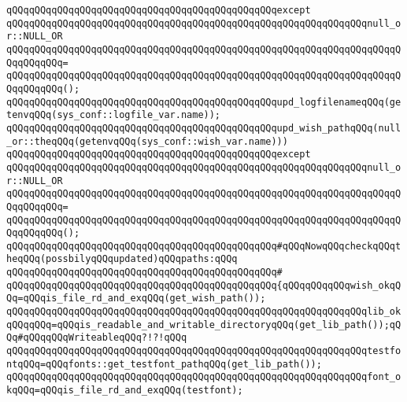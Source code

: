 \verb|qQQqqQQqqQQqqQQqqQQqqQQqqQQqqQQqqQQqqQQqqQQqqQQqexcept|\newline
\verb|qQQqqQQqqQQqqQQqqQQqqQQqqQQqqQQqqQQqqQQqqQQqqQQqqQQqqQQqqQQqqQQqnull_or::NULL_OR|\newline
\verb|qQQqqQQqqQQqqQQqqQQqqQQqqQQqqQQqqQQqqQQqqQQqqQQqqQQqqQQqqQQqqQQqqQQqqQQqqQQqqQQq=|\newline
\verb|qQQqqQQqqQQqqQQqqQQqqQQqqQQqqQQqqQQqqQQqqQQqqQQqqQQqqQQqqQQqqQQqqQQqqQQqqQQqqQQq();|\newline
\newline
\verb|qQQqqQQqqQQqqQQqqQQqqQQqqQQqqQQqqQQqqQQqqQQqqQQqupd_logfilenameqQQq(getenvqQQq(sys_conf::logfile_var.name));|\newline
\newline
\verb|qQQqqQQqqQQqqQQqqQQqqQQqqQQqqQQqqQQqqQQqqQQqqQQqupd_wish_pathqQQq(null_or::theqQQq(getenvqQQq(sys_conf::wish_var.name)))|\newline
\verb|qQQqqQQqqQQqqQQqqQQqqQQqqQQqqQQqqQQqqQQqqQQqqQQqexcept|\newline
\verb|qQQqqQQqqQQqqQQqqQQqqQQqqQQqqQQqqQQqqQQqqQQqqQQqqQQqqQQqqQQqqQQqnull_or::NULL_OR|\newline
\verb|qQQqqQQqqQQqqQQqqQQqqQQqqQQqqQQqqQQqqQQqqQQqqQQqqQQqqQQqqQQqqQQqqQQqqQQqqQQqqQQq=|\newline
\verb|qQQqqQQqqQQqqQQqqQQqqQQqqQQqqQQqqQQqqQQqqQQqqQQqqQQqqQQqqQQqqQQqqQQqqQQqqQQqqQQq();|\newline
\newline
\verb|qQQqqQQqqQQqqQQqqQQqqQQqqQQqqQQqqQQqqQQqqQQqqQQq#qQQqNowqQQqcheckqQQqtheqQQq(possbilyqQQqupdated)qQQqpaths:qQQq|\newline
\verb|qQQqqQQqqQQqqQQqqQQqqQQqqQQqqQQqqQQqqQQqqQQqqQQq#|\newline
\verb|qQQqqQQqqQQqqQQqqQQqqQQqqQQqqQQqqQQqqQQqqQQqqQQq{qQQqqQQqqQQqwish_okqQQq=qQQqis_file_rd_and_exqQQq(get_wish_path());|\newline
\verb|qQQqqQQqqQQqqQQqqQQqqQQqqQQqqQQqqQQqqQQqqQQqqQQqqQQqqQQqqQQqqQQqlib_okqQQqqQQq=qQQqis_readable_and_writable_directoryqQQq(get_lib_path());qQQq#qQQqqQQqWriteableqQQq?!?!qQQq|\newline
\newline
\verb|qQQqqQQqqQQqqQQqqQQqqQQqqQQqqQQqqQQqqQQqqQQqqQQqqQQqqQQqqQQqqQQqtestfontqQQq=qQQqfonts::get_testfont_pathqQQq(get_lib_path());|\newline
\newline
\verb|qQQqqQQqqQQqqQQqqQQqqQQqqQQqqQQqqQQqqQQqqQQqqQQqqQQqqQQqqQQqqQQqfont_okqQQq=qQQqis_file_rd_and_exqQQq(testfont);|\newline
